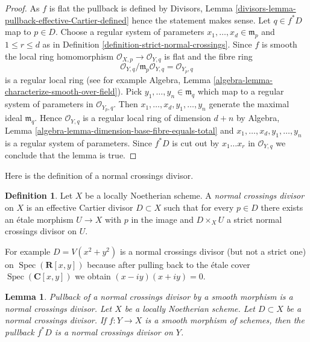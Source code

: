 \documentclass{stacks-project}
\newenvironment{slogan}{\comment}{\endcomment}
\theoremstyle{plain}
\newtheorem{lemma}[subsection]{Lemma}
\theoremstyle{definition}
\newtheorem{definition}[subsection]{Definition}
\theoremstyle{remark}
\numberwithin{equation}{subsection}
\def\Spec{\mathop{\mathrm{Spec}}}
\begin{document}
\begin{proof}
As $f$ is flat the pullback is defined by
Divisors, Lemma \ref{divisors-lemma-pullback-effective-Cartier-defined}
hence the statement makes sense.
Let $q \in f^*D$ map to $p \in D$. Choose a regular system
of parameters $x_1, \ldots, x_d \in \mathfrak m_p$
and $1 \leq r \leq d$ as in
Definition \ref{definition-strict-normal-crossings}.
Since $f$ is smooth the local ring homomorphism
$\mathcal{O}_{X, p} \to \mathcal{O}_{Y, q}$ is flat
and the fibre ring
$$
\mathcal{O}_{Y, q}/\mathfrak m_p \mathcal{O}_{Y, q} =
\mathcal{O}_{Y_p, q}
$$
is a regular local ring (see for example
Algebra, Lemma \ref{algebra-lemma-characterize-smooth-over-field}).
Pick $y_1, \ldots, y_n \in \mathfrak m_q$ which map to a regular
system of parameters in $\mathcal{O}_{Y_p, q}$.
Then $x_1, \ldots, x_d, y_1, \ldots, y_n$ generate the
maximal ideal $\mathfrak m_q$. Hence $\mathcal{O}_{Y, q}$
is a regular local ring of dimension
$d + n$ by Algebra, Lemma \ref{algebra-lemma-dimension-base-fibre-equals-total}
and $x_1, \ldots, x_d, y_1, \ldots, y_n$
is a regular system of parameters. Since $f^*D$ is cut
out by $x_1 \ldots x_r$ in $\mathcal{O}_{Y, q}$ we conclude
that the lemma is true.
\end{proof}

\noindent
Here is the definition of a normal crossings divisor.

\begin{definition}
\label{definition-normal-crossings}
Let $X$ be a locally Noetherian scheme. A {\it normal crossings divisor}
on $X$ is an effective Cartier divisor $D \subset X$ such that for
every $p \in D$ there exists an \'etale morphism $U \to X$ with
$p$ in the image and $D \times_X U$ a
strict normal crossings divisor on $U$.
\end{definition}

\noindent
For example $D = V(x^2 + y^2)$ is a normal crossings divisor
(but not a strict one) on
$\Spec(\mathbf{R}[x, y])$ because after pulling back to
the \'etale cover $\Spec(\mathbf{C}[x, y])$ we obtain $(x - iy)(x + iy) = 0$.

\begin{lemma}
\label{lemma-smooth-pullback-normal-crossings}
\begin{slogan}
Pullback of a normal crossings divisor by a smooth
morphism is a normal crossings divisor.
\end{slogan}
Let $X$ be a locally Noetherian scheme. Let $D \subset X$ be a
normal crossings divisor. If $f : Y \to X$ is a smooth
morphism of schemes, then the pullback $f^*D$ is a
normal crossings divisor on $Y$.
\end{lemma}
\end{document}
